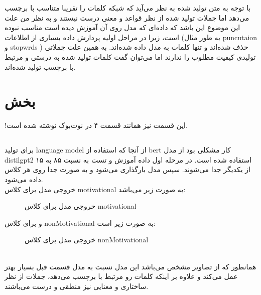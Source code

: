 \documentclass[a4paper]{article}
\begin{document}
با توجه به متن تولید شده به نظر می‌آید که شبکه کلمات را تقریبا متناسب با برچسب می‌دهد اما جملات تولید شده از نظر قواعد و معنی درست نیستند و به نظر من علت این موضوع این باشد که داده‌ای که مدل روی آن آموزش دیده است مناسب نبوده است، زیرا در مراحل اولیه پردازش داده بسیاری از اطلاعات (به طور مثال puncutaion و stopwrds ) حذف شده‌اند و تنها کلمات به مدل داده شده‌اند. به همین علت جملاتی تولیدی کیفیت مطلوب را ندارند اما می‌توان گفت کلمات تولید شده به درستی و مرتبط با برچسب تولید شده‌اند.

\section{بخش }
!این قسمت نیز همانند قسمت ۴ در نوت‌بوک نوشته شده است.
\subsection{}
برای تولید language  model از آنجا که استفاده از bert کار مشکلی بود از مدل distilgpt2 استفاده شده است. در مرحله اول داده آموزش و تست به نسبت ۸۵ به ۱۵ از یکدیگر جدا می‌شوند. سپس مدل  بارگذاری می‌شود و به صورت جدا روی هر کلاس داده  می‌شود.
\\
خروجی مدل برای کلاس motivational به صورت زیر می‌باشد:
\begin{figure}[h!]
\caption{خروجی مدل برای کلاس motivational}
\label{f1}
\end{figure}
\vspace{10mm}

و برای کلاس nonMotivational به صورت زیر است:
\begin{figure}[h!]
\caption{خروجی مدل برای کلاس nonMotivational}
\label{f1}
\end{figure}
\vspace{10mm}
\\
همانطور که از تصاویر مشخص می‌باشد این مدل نسبت به مدل قسمت قبل بسیار بهتر عمل می‌کند و علاوه بر اینکه کلمات رو مرتبط با برچسب می‌دهد، جملات از نظر ساختاری و معنایی نیز منطقی و درست می‌باشند.
\end{document}
